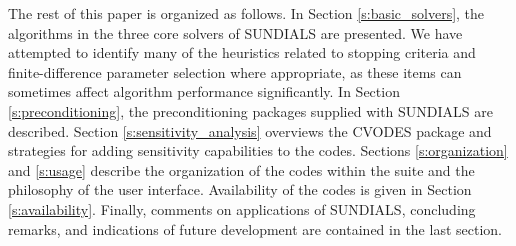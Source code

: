 The rest of this paper is organized as follows.  In Section
\ref{s:basic_solvers}, the algorithms in the three core solvers of
SUNDIALS are presented. We have attempted to identify many of the
heuristics related to stopping criteria and finite-difference
parameter selection where appropriate, as these items can
sometimes affect algorithm performance significantly. In Section
\ref{s:preconditioning}, the preconditioning packages supplied
with SUNDIALS are described.  Section \ref{s:sensitivity_analysis}
overviews the CVODES package and strategies for adding sensitivity
capabilities to the codes. Sections \ref{s:organization} and
\ref{s:usage} describe the organization of the codes within the
suite and the philosophy of the user interface. Availability of
the codes is given in Section \ref{s:availability}.  Finally,
comments on applications of SUNDIALS, concluding remarks, and
indications of future development are contained in the last
section.
